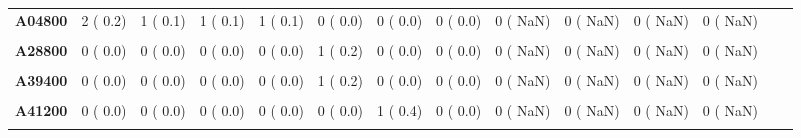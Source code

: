 \documentclass[
]{article}
\begin{document}
\begin{table}[H]
\begin{tabular}[t]{>{\raggedright\arraybackslash}p{5em}ccccccccccccc}
\textbf{A04800} & 2 (  0.2) & 1 (  0.1) & 1 (  0.1) & 1 (  0.1) & 0 (  0.0) & 0 (  0.0) & 0 (  0.0) & 0 (  NaN) & 0 (  NaN) & 0 (  NaN) & 0 (  NaN) &  & \\
\textbf{\cellcolor{gray!10}{A09000}} & \cellcolor{gray!10}{1 (  0.1)} & \cellcolor{gray!10}{2 (  0.2)} & \cellcolor{gray!10}{0 (  0.0)} & \cellcolor{gray!10}{1 (  0.1)} & \cellcolor{gray!10}{1 (  0.2)} & \cellcolor{gray!10}{0 (  0.0)} & \cellcolor{gray!10}{1 (  0.4)} & \cellcolor{gray!10}{0 (  NaN)} & \cellcolor{gray!10}{0 (  NaN)} & \cellcolor{gray!10}{0 (  NaN)} & \cellcolor{gray!10}{0 (  NaN)} & \cellcolor{gray!10}{} & \cellcolor{gray!10}{}\\
\textbf{A28800} & 0 (  0.0) & 0 (  0.0) & 0 (  0.0) & 0 (  0.0) & 1 (  0.2) & 0 (  0.0) & 0 (  0.0) & 0 (  NaN) & 0 (  NaN) & 0 (  NaN) & 0 (  NaN) &  & \\
\textbf{\cellcolor{gray!10}{A32700}} & \cellcolor{gray!10}{0 (  0.0)} & \cellcolor{gray!10}{1 (  0.1)} & \cellcolor{gray!10}{0 (  0.0)} & \cellcolor{gray!10}{0 (  0.0)} & \cellcolor{gray!10}{0 (  0.0)} & \cellcolor{gray!10}{0 (  0.0)} & \cellcolor{gray!10}{0 (  0.0)} & \cellcolor{gray!10}{0 (  NaN)} & \cellcolor{gray!10}{0 (  NaN)} & \cellcolor{gray!10}{0 (  NaN)} & \cellcolor{gray!10}{0 (  NaN)} & \cellcolor{gray!10}{} & \cellcolor{gray!10}{}\\
\textbf{A39400} & 0 (  0.0) & 0 (  0.0) & 0 (  0.0) & 0 (  0.0) & 1 (  0.2) & 0 (  0.0) & 0 (  0.0) & 0 (  NaN) & 0 (  NaN) & 0 (  NaN) & 0 (  NaN) &  & \\
\textbf{\cellcolor{gray!10}{A41000}} & \cellcolor{gray!10}{1 (  0.1)} & \cellcolor{gray!10}{1 (  0.1)} & \cellcolor{gray!10}{0 (  0.0)} & \cellcolor{gray!10}{0 (  0.0)} & \cellcolor{gray!10}{0 (  0.0)} & \cellcolor{gray!10}{1 (  0.4)} & \cellcolor{gray!10}{0 (  0.0)} & \cellcolor{gray!10}{0 (  NaN)} & \cellcolor{gray!10}{0 (  NaN)} & \cellcolor{gray!10}{0 (  NaN)} & \cellcolor{gray!10}{0 (  NaN)} & \cellcolor{gray!10}{} & \cellcolor{gray!10}{}\\
\textbf{A41200} & 0 (  0.0) & 0 (  0.0) & 0 (  0.0) & 0 (  0.0) & 0 (  0.0) & 1 (  0.4) & 0 (  0.0) & 0 (  NaN) & 0 (  NaN) & 0 (  NaN) & 0 (  NaN) &  & \\
\textbf{\cellcolor{gray!10}{A41500}} & \cellcolor{gray!10}{1 (  0.1)} & \cellcolor{gray!10}{0 (  0.0)} & \cellcolor{gray!10}{1 (  0.1)} & \cellcolor{gray!10}{1 (  0.1)} & \cellcolor{gray!10}{0 (  0.0)} & \cellcolor{gray!10}{1 (  0.4)} & \cellcolor{gray!10}{0 (  0.0)} & \cellcolor{gray!10}{0 (  NaN)} & \cellcolor{gray!10}{0 (  NaN)} & \cellcolor{gray!10}{0 (  NaN)} & \cellcolor{gray!10}{0 (  NaN)} & \cellcolor{gray!10}{} & \cellcolor{gray!10}{}\\

\end{tabular}
\end{table}
\end{document}
